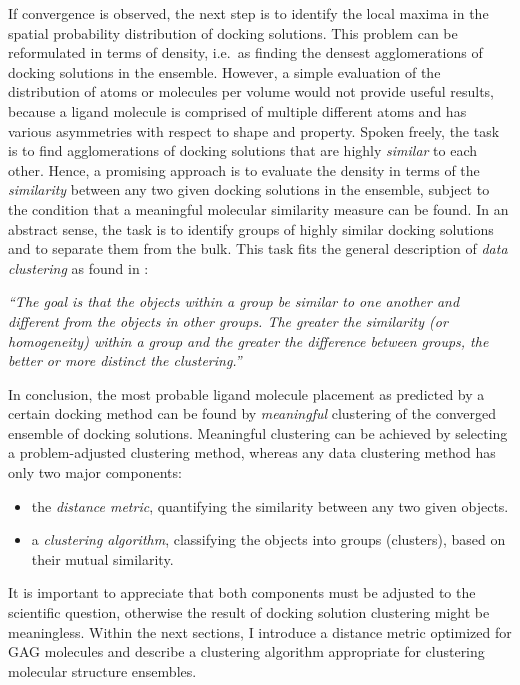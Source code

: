 If convergence is observed, the next step is to identify the local maxima in the
spatial probability distribution of docking solutions. This problem can be
reformulated in terms of density, i.e.\ as finding the densest agglomerations of
docking solutions in the ensemble. However, a simple evaluation of the
distribution of atoms or molecules per volume would not provide useful results,
because a ligand molecule is comprised of multiple different atoms and has
various asymmetries with respect to shape and property. Spoken freely, the task
is to find agglomerations of docking solutions that are highly \textit{similar}
to each other. Hence, a promising approach is to evaluate the density in terms
of the \textit{similarity} between any two given docking solutions in the
ensemble, subject to the condition that a meaningful molecular similarity
measure can be found. In an abstract sense, the task is to identify groups of
highly similar docking solutions and to separate them from the bulk. This task
fits the general description of \textit{data clustering} as found in
\cite{tan_data_mining}:

\begin{adjustwidth}{1.5cm}{1.5cm}
\textit{%
\enquote{The goal is that the objects within a group be similar to one another
and different from the objects in other groups. The greater the similarity (or
homogeneity) within a group and the greater the difference between groups, the
better or more distinct the clustering.}}
\end{adjustwidth}

In conclusion, the most probable ligand molecule placement as predicted by a
certain docking method can be found by \textit{meaningful} clustering of the
converged ensemble of docking solutions. Meaningful clustering can be achieved
by selecting a problem-adjusted clustering method, whereas any data clustering
method has only two major components:

\begin{itemize}
\item the \textit{distance metric}, quantifying the similarity between any two
given objects.
\item a \textit{clustering algorithm}, classifying the objects into groups
(clusters), based on their mutual similarity.
\end{itemize}

It is important to appreciate that both components must be adjusted to the
scientific question, otherwise the result of docking solution clustering might
be meaningless. Within the next sections, I introduce a distance metric
optimized for GAG molecules and describe a clustering algorithm appropriate for
clustering molecular structure ensembles.


